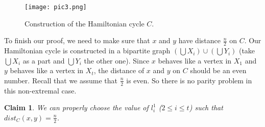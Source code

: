\documentclass[11pt]{article}
\newtheorem{claim}[lemma]{Claim}
\begin{document}
\begin{figure}[htbp]
\centering
\texttt{[image: pic3.png]}
\caption{Construction of the Hamiltonian cycle $C$.}
\end{figure}


To finish our proof, we need to make sure that $x$ and $y$ have distance $\frac{n}{2}$ on $C$. Our Hamiltonian cycle is constructed in a bipartite graph $(\bigcup X_i)\cup (\bigcup Y_i)$ (take $\bigcup X_i$ as a part and $\bigcup Y_i$ the other one). Since $x$ behaves like a vertex in $X_1$ and $y$ behaves like a vertex in $X_t$, the distance of $x$ and $y$ on $C$ should be an even number. Recall that we assume that $\frac{n}{2}$ is even. So there is no parity problem in this non-extremal case.

\begin{claim}\label{proper}
We can properly choose the value of $l_i^1$ ($2\leq i\leq t$) such that $dist_C(x,y)=\frac{n}{2}$.
\end{claim}
\end{document}
